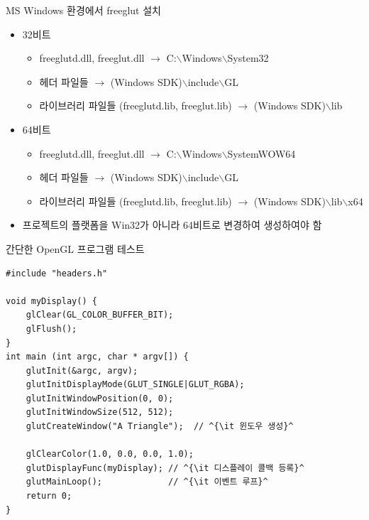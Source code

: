 \documentclass{beamer}
\begin{document}
\begin{frame}{MS Windows 환경에서 freeglut 설치}

\begin{itemize}
\item 32비트
	\begin{itemize}
	\item freeglutd.dll, freeglut.dll $\rightarrow$ C:$\backslash$Windows$\backslash$System32
	\item 헤더 파일들 $\rightarrow$ (Windows SDK)$\backslash$include$\backslash$GL
	\item 라이브러리 파일들 (freeglutd.lib, freeglut.lib) $\rightarrow$ (Windows SDK)$\backslash$lib
	\end{itemize}
\end{itemize}

\begin{itemize}
\item 64비트
	\begin{itemize}
	\item freeglutd.dll, freeglut.dll $\rightarrow$ C:$\backslash$Windows$\backslash$SystemWOW64
	\item 헤더 파일들 $\rightarrow$ (Windows SDK)$\backslash$include$\backslash$GL
	\item 라이브러리 파일들 (freeglutd.lib, freeglut.lib) $\rightarrow$ (Windows SDK)$\backslash$lib$\backslash$x64
	\end{itemize}
\item 프로젝트의 플랫폼을 Win32가 아니라 64비트로 변경하여 생성하여야 함
\end{itemize}

\end{frame}


\begin{frame}[fragile]{간단한 OpenGL 프로그램 테스트}
\lstset{language=C++,escapechar=^} 
\begin{lstlisting}
#include "headers.h"

void myDisplay() {
    glClear(GL_COLOR_BUFFER_BIT);
    glFlush();    
}
int main (int argc, char * argv[]) {
    glutInit(&argc, argv);
    glutInitDisplayMode(GLUT_SINGLE|GLUT_RGBA);
    glutInitWindowPosition(0, 0);
    glutInitWindowSize(512, 512);
    glutCreateWindow("A Triangle");  // ^{\it 윈도우 생성}^

    glClearColor(1.0, 0.0, 0.0, 1.0);
    glutDisplayFunc(myDisplay);	// ^{\it 디스플레이 콜백 등록}^
    glutMainLoop();				// ^{\it 이벤트 루프}^
    return 0;
}
\end{lstlisting}
\end{frame}
\end{document}
